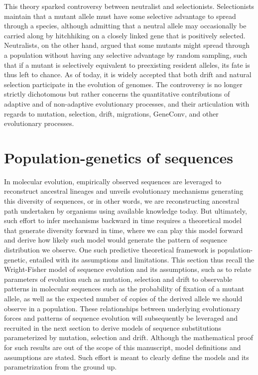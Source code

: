 This theory sparked controversy between neutralist and selectionists.
Selectionists maintain that a mutant \gls{allele} must have some selective advantage to spread through a species, although admitting that a \gls{neutral} \gls{allele} may occasionally be carried along by hitchhiking on a closely linked gene that is positively selected.
Neutralists, on the other hand, argued that some mutants might spread through a population without having any selective advantage by random sampling, such that if a mutant is selectively equivalent to preexisting resident \glspl{allele}, its fate is thus left to chance.
As of today, it is widely accepted that both \gls{drift} and natural selection participate in the evolution of genomes.
The controversy is no longer strictly dichotomous but rather concerns the quantitative contributions of adaptive and of non-adaptive evolutionary processes, and their articulation with regards to mutation, selection, drift, migrations, \gls{GeneConv}, and other evolutionary processes.

\section{Population-genetics of sequences}
In molecular evolution, empirically observed sequences are leveraged to reconstruct ancestral lineages and unveils evolutionary mechanisms generating this diversity of sequences, or in other words, we are reconstructing ancestral path undertaken by organisms using available knowledge today.
But ultimately, such effort to infer mechanisms backward in time requires a theoretical model that generate diversity forward in time, where we can play this model forward and derive how likely such model would generate the pattern of sequence distribution we observe.
One such predictive theoretical framework is population-genetic, entailed with its assumptions and limitations.
This section thus recall the Wright-Fisher model of sequence evolution and its assumptions, such as to relate parameters of evolution such as mutation, selection and drift to observable patterns in molecular sequences such as the probability of fixation of a mutant \gls{allele}, as well as the expected number of copies of the derived \gls{allele} we should observe in a population.
These relationships between underlying evolutionary forces and patterns of sequence evolution will subsequently be leveraged and recruited in the next section to derive models of sequence \glspl{substitution} parameterized by mutation, selection and drift.
Although the mathematical proof for such results are out of the scope of this manuscript, model definitions and assumptions are stated. 
Such effort is meant to clearly define the models and its parametrization from the ground up. 

